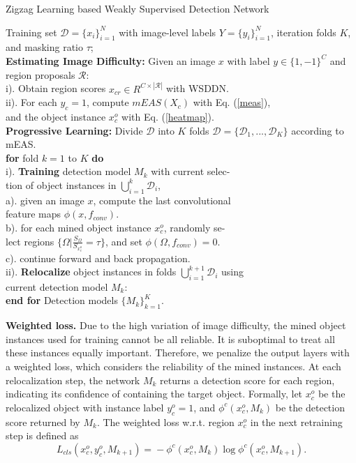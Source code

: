 \documentclass[10pt,twocolumn,letterpaper]{article}
\begin{document}
\begin{algorithm}[t]
\caption{Zigzag Learning based Weakly Supervised Detection Network}\label{algorithm1}
\begin{algorithmic}
\REQUIRE  Training set $\mathcal{D} = \{x_i\}_{i=1}^N$ with image-level labels $Y=\{y_i\}_{i=1}^N$, iteration folds $K$, and masking ratio $\tau$; \\
\textbf{Estimating Image Difficulty:} Given an image $x$ with label $y \in \{1,-1\}^C$ and region proposals $\mathcal{R}$:\\
\quad i). Obtain region scores $x_{cr}\!\in\!{R^{C\times\mathcal{|R|}}}$ with WSDDN.\\
\quad ii). For each $y_c=1$, compute $\textit{mEAS}(X_c)$ with Eq. (\ref{meas}), \\
\quad and the object instance $x_{c}^o$ with Eq. (\ref{heatmap}).\\
\textbf{Progressive Learning:} Divide $\mathcal{D}$ into $K$ folds $\mathcal{D}=\{\mathcal{D}_1,...,\mathcal{D}_K\}$ according to mEAS.\\
\textbf{for} fold $k=1$ to $K$ \textbf{do}\\
\quad i). \textbf{Training} detection model $M_k$ with current selec-\\
\quad tion of object instances in $\bigcup_{i=1}^k \mathcal{D}_i$, \\
 \quad \quad a). given an image $x$, compute the last convolutional \\
  \quad \quad feature maps $\phi(x,f_{conv})$. \\
 \quad \quad b). for each mined object instance $x_c^o$, randomly se-\\
  \quad \quad lect regions $\{\Omega|\frac{S_{\Omega}}{S_{x_c^o}}=\tau\} $, and set $\phi(\Omega, f_{conv})=0$. \\
\quad  \quad c). continue forward and back propagation. \\
\quad ii). \textbf{Relocalize} object instances in folds $\bigcup_{i=1}^{k+1} \mathcal{D}_i$ using \\
 \quad current detection model $M_k$:\\
 \textbf{end for}
\ENSURE Detection models $\{M_k\}_{k=1}^K$.
\end{algorithmic}
\end{algorithm}

\textbf{Weighted loss.} Due to the high variation of image difficulty, the mined object instances used for training cannot be all reliable. It is suboptimal to treat all these instances equally important. Therefore, we penalize the output layers with a weighted loss, which considers the reliability of the mined instances. At each relocalization step, the network $M_k$ returns a detection score for each region, indicating its confidence of containing the target object. Formally, let $x^o_c$ be the relocalized object with instance label $y^o_c\!=\!1$, and $\phi^c(x^o_{c},M_k)$ be the detection score returned by $M_k$. The weighted loss w.r.t. region $x^o_c$ in the next retraining step is defined as
\begin{equation}\label{reg_loss}
\!L_{cls}(x^o_c,y^o_c,M_{k\!+\!1})\!=\!-\phi^c(x^o_{c},M_k)\log\phi^c(x^o_c, M_{k\!+\!1}).
\end{equation}
\end{document}
